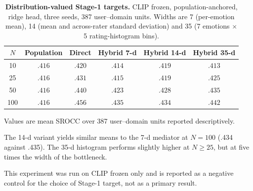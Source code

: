 \begin{table}[t]
\centering
\begin{threeparttable}
    \caption{\textbf{Distribution-valued Stage-1 targets.} CLIP frozen, population-anchored, ridge head, three seeds, 387 user--domain units. Widths are 7 (per-emotion mean), 14 (mean and across-rater standard deviation) and 35 (7 emotions $\times$ 5 rating-histogram bins).}
    \label{tab:distribution}
    \small
    \setlength{\tabcolsep}{3.5pt}
        \begin{tabular}{@{}c cc ccc@{}}
        \toprule
        $N$ & Population & Direct & Hybrid 7-d & Hybrid 14-d & Hybrid 35-d \\
        \midrule
        10  & $.416$ & $.420$ & $.414$ & $.419$ & $.413$ \\
        25  & $.416$ & $.431$ & $.415$ & $.419$ & $.425$ \\
        50  & $.416$ & $.440$ & $.423$ & $.428$ & $.435$ \\
        100 & $.416$ & $.456$ & $.435$ & $.434$ & $.442$ \\
        \bottomrule
        \end{tabular}
    \begin{tablenotes}[flushleft]\footnotesize
    \item Values are mean SROCC over 387 user--domain units reported descriptively.
    \item The 14-d variant yields similar means to the 7-d mediator at $N=100$ (.434 against .435). The 35-d histogram performs slightly higher at $N\ge25$, but at five times the width of the bottleneck.
    \item This experiment was run on CLIP frozen only and is reported as a negative control for the choice of Stage-1 target, not as a primary result.
    \end{tablenotes}
\end{threeparttable}
\end{table}
% 
